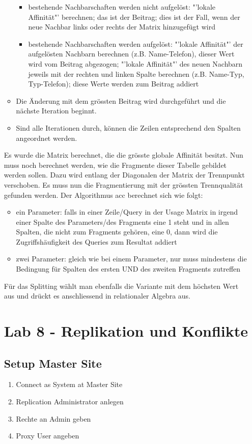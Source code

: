 \documentclass[a4paper,10pt,titlepage=false]{scrreprt}
\begin{document}
\begin{itemize}
\begin{itemize}
\begin{itemize}
\item bestehende Nachbarschaften werden nicht aufgelöst: "'lokale Affinität"' berechnen; das ist der Beitrag; dies ist der Fall, wenn der neue Nachbar links oder rechts der Matrix hinzugefügt wird
\item bestehende Nachbarschaften werden aufgelöst: "'lokale Affinität"' der aufgelösten Nachbarn berechnen (z.B. Name-Telefon), dieser Wert wird vom Beitrag abgezogen; "'lokale Affinität"' des neuen Nachbarn jeweils mit der rechten und linken Spalte berechnen (z.B. Name-Typ, Typ-Telefon); diese Werte werden zum Beitrag addiert
\end{itemize}
\item Die Änderung mit dem grössten Beitrag wird durchgeführt und die nächste Iteration beginnt.
\item Sind alle Iterationen durch, können die Zeilen entsprechend den Spalten angeordnet werden.
\end{itemize}
Es wurde die Matrix berechnet, die die grösste globale Affinität besitzt. Nun muss noch berechnet werden, wie die Fragmente dieser Tabelle gebildet werden sollen. Dazu wird entlang der Diagonalen der Matrix der Trennpunkt verschoben. Es muss nun die Fragmentierung mit der grössten Trennqualität gefunden werden. Der Algorithmus acc berechnet sich wie folgt:
\begin{itemize}
\item ein Parameter: falls in einer Zeile/Query in der Usage Matrix in irgend einer Spalte des Parameters/des Fragments eine 1 steht und in allen Spalten, die nicht zum Fragments gehören, eine 0, dann wird die Zugriffshäufigkeit des Queries zum Resultat addiert
\item zwei Parameter: gleich wie bei einem Parameter, nur muss mindestens die Bedingung für Spalten des ersten UND des zweiten Fragments zutreffen
\end{itemize}
Für das Splitting wählt man ebenfalls die Variante mit dem höchsten Wert aus und drückt es anschliessend in relationaler Algebra aus.

\chapter{Lab 8 - Replikation und Konflikte}

\section{Setup Master Site} %
\label{sec:setup_master_site}
\begin{enumerate}
  \item Connect as System at Master Site
  \item Replication Administrator anlegen
  \item Rechte an Admin geben
  \item Proxy User angeben
\end{enumerate}


\end{itemize}
\end{document}
